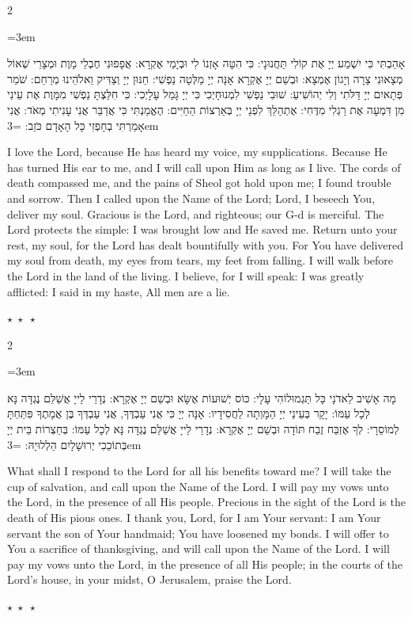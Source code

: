 \documentclass[11pt, openany]{book}
\newenvironment{bilingual}{%
  \par\vspace{4pt}%
  \begin{paracol}{2}%
}{%
  \end{paracol}%
  \par\vspace{2pt}%
}
\newenvironment{hebrewcol}{%
  \switchcolumn[1]%
  \begingroup
  \RTL
  \hebrewfont\large
  \setstretch{1.4}%
  \emergencystretch=3em
  \tolerance=9999
  \parindent=0pt\relax
}{%
  \endRTL
  \endgroup
}
\newenvironment{englishcol}{%
  \switchcolumn[0]%
  \begingroup
  \setstretch{1.4}%
  \emergencystretch=3em
  \tolerance=9999
  \normalsize
  \rightskip=0.12in\relax
}{%
  \endgroup
}
\newcommand{\parasep}{%
  \par\vspace{3pt}
  \begin{center}
    \textcolor{sedergold!50}{\small$\star\;\star\;\star$}
  \end{center}
  \par\vspace{3pt}
}
\begin{document}
\begin{bilingual}
\begin{hebrewcol}
אָהַבְתִּי כִּי יִשְׁמַע יְיָ אֶת קוֹלִי תַּחֲנוּנָי: כִּי הִטָּה אָזְנוֹ לִי וּבְיָמַי אֶקְרָא: אֲפָפוּנִי חֶבְלֵי מָוֶת וּמְצָרֵי שְׁאוֹל מְצָאוּנִי צָרָה וְיָגוֹן אֶמְצָא: וּבְשֵׁם יְיָ אֶקְרָא אָנָּה יְיָ מַלְּטָה נַפְשִׁי: חַנּוּן יְיָ וְצַדִּיק וֵאלֹהֵינוּ מְרַחֵם: שֹׁמֵר פְּתָאיִם יְיָ דַּלֹּתִי וְלִי יְהוֹשִׁיעַ: שׁוּבִי נַפְשִׁי לִמְנוּחָיְכִי כִּי יְיָ גָּמַל עָלָיְכִי: כִּי חִלַּצְתָּ נַפְשִׁי מִמָּוֶת אֶת עֵינִי מִן דִּמְעָה אֶת רַגְלִי מִדֶּחִי: אֶתְהַלֵּךְ לִפְנֵי יְיָ בְּאַרְצוֹת הַחַיִּים: הֶאֱמַנְתִּי כִּי אֲדַבֵּר אֲנִי עָנִיתִי מְאֹד: אֲנִי אָמַרְתִּי בְחָפְזִי כָּל הָאָדָם כֹּזֵב:
\end{hebrewcol}
\begin{englishcol}
I love the Lord, because He has heard my voice, my supplications. Because He has turned His ear to me, and I will call upon Him as long as I live. The cords of death compassed me, and the pains of Sheol got hold upon me; I found trouble and sorrow. Then I called upon the Name of the Lord; Lord, I beseech You, deliver my soul. Gracious is the Lord, and righteous; our G-d is merciful. The Lord protects the simple: I was brought low and He saved me. Return unto your rest, my soul, for the Lord has dealt bountifully with you. For You have delivered my soul from death, my eyes from tears, my feet from falling. I will walk before the Lord in the land of the living. I believe, for I will speak: I was greatly afflicted: I said in my haste, All men are a lie.
\end{englishcol}
\end{bilingual}
\parasep

\begin{bilingual}
\begin{hebrewcol}
מָה אָשִׁיב לַאדֹנָי כָּל תַּגְמוּלוֹהִי עָלָי: כּוֹס יְשׁוּעוֹת אֶשָּׂא וּבְשֵׁם יְיָ אֶקְרָא: נְדָרַי לַייָ אֲשַׁלֵּם נֶגְדָּה נָּא לְכָל עַמּוֹ: יָקָר בְּעֵינֵי יְיָ הַמָּוְתָה לַחֲסִידָיו: אָנָּה יְיָ כִּי אֲנִי עַבְדֶּךָ, אֲנִי עַבְדְּךָ בֶּן אֲמָתֶךָ פִּתַּחְתָּ לְמוֹסֵרָי: לְךָ אֶזְבַּח זֶבַח תּוֹדָה וּבְשֵׁם יְיָ אֶקְרָא: נְדָרַי לַייָ אֲשַׁלֵּם נֶגְדָּה נָּא לְכָל עַמּוֹ: בְּחַצְרוֹת בֵּית יְיָ בְּתוֹכֵכִי יְרוּשָׁלָיִם הַלְלוּיָהּ:
\end{hebrewcol}
\begin{englishcol}
What shall I respond to the Lord for all his benefits toward me? I will take the cup of salvation, and call upon the Name of the Lord. I will pay my vows unto the Lord, in the presence of all His people. Precious in the sight of the Lord is the death of His pious ones. I thank you, Lord, for I am Your servant: I am Your servant the son of Your handmaid; You have loosened my bonds. I will offer to You a sacrifice of thanksgiving, and will call upon the Name of the Lord. I will pay my vows unto the Lord, in the presence of all His people; in the courts of the Lord's house, in your midst, O Jerusalem, praise the Lord.
\end{englishcol}
\end{bilingual}
\parasep
\end{document}
